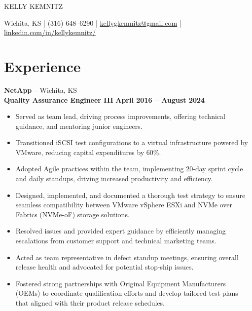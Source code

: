 \documentclass[10pt]{article}       %
\begin{document}
\centerline{\Huge KELLY KEMNITZ}

\vspace{5pt}

\centerline{\large Wichita, KS | (316) 648–6290 | \href{mailto:kellygkemnitz@gmail.com}{kellygkemnitz@gmail.com} | \href{https://www.linkedin.com/in/kellykemnitz/}{linkedin.com/in/kellykemnitz/}}

\vspace{-10pt}

\section*{Experience}
\textbf{NetApp} – Wichita, KS \\
\textbf{Quality Assurance Engineer III} \hfill \textbf{April 2016 – August 2024} \\
\vspace{-6.5pt}
\begin{itemize}
  \item Served as team lead, driving process improvements, offering technical guidance, and mentoring junior engineers.
  \item Transitioned iSCSI test configurations to a virtual infrastructure powered by VMware, reducing capital expenditures by 60\%.
  \item Adopted Agile practices within the team, implementing 20-day sprint cycle and daily standups, driving increased productivity and efficiency.
  \item Designed, implemented, and documented a thorough test strategy to ensure seamless compatibility between VMware vSphere ESXi and NVMe over Fabrics (NVMe-oF) storage solutions.
  \item Resolved issues and provided expert guidance by efficiently managing escalations from customer support and technical marketing teams.
  \item Acted as team representative in defect standup meetings, ensuring overall release health and advocated for potential stop-ship issues.
  \item Fostered strong partnerships with Original Equipment Manufacturers (OEMs) to coordinate qualification efforts and develop tailored test plans that aligned with their product release schedules.
\end{itemize}
\end{document}
